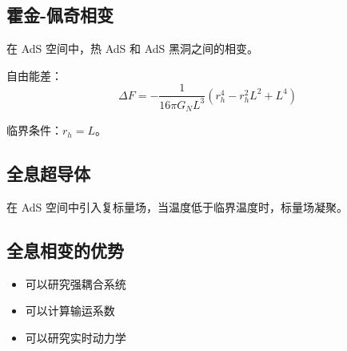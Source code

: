 \documentclass[12pt,a4paper]{ctexart}
\begin{document}
\subsection{霍金-佩奇相变}

在 AdS 空间中，热 AdS 和 AdS 黑洞之间的相变。

自由能差：
\begin{equation}
    \Delta F = -\frac{1}{16\pi G_N L^3} \left( r_h^4 - r_h^2 L^2 + L^4 \right)
\end{equation}

临界条件：$r_h = L$。

\subsection{全息超导体}

在 AdS 空间中引入复标量场，当温度低于临界温度时，标量场凝聚。

\subsection{全息相变的优势}

\begin{itemize}
    \item 可以研究强耦合系统
    \item 可以计算输运系数
    \item 可以研究实时动力学
\end{itemize}
\end{document}
